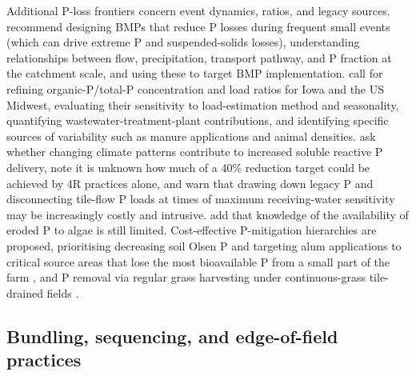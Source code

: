 \documentclass[11pt]{article}
\begin{document}
Additional P-loss frontiers concern event dynamics, ratios, and legacy sources. \textcite{Brendel2019} recommend designing BMPs that reduce P losses during frequent small events (which can drive extreme P and suspended-solids losses), understanding relationships between flow, precipitation, transport pathway, and P fraction at the catchment scale, and using these to target BMP implementation. \textcite{Schilling2017b} call for refining organic-P/total-P concentration and load ratios for Iowa and the US Midwest, evaluating their sensitivity to load-estimation method and seasonality, quantifying wastewater-treatment-plant contributions, and identifying specific sources of variability such as manure applications and animal densities. \textcite{Jarvie2017} ask whether changing climate patterns contribute to increased soluble reactive P delivery, note it is unknown how much of a 40\% reduction target could be achieved by 4R practices alone, and warn that drawing down legacy P and disconnecting tile-flow P loads at times of maximum receiving-water sensitivity may be increasingly costly and intrusive. \textcite{Ulén2007} add that knowledge of the availability of eroded P to algae is still limited. Cost-effective P-mitigation hierarchies are proposed, prioritising decreasing soil Olsen P and targeting alum applications to critical source areas that lose the most bioavailable P from a small part of the farm \parencite{McDowell2015}, and P removal via regular grass harvesting under continuous-grass tile-drained fields \parencite{Zhang2015b}.

\subsection{Bundling, sequencing, and edge-of-field practices}
\end{document}
